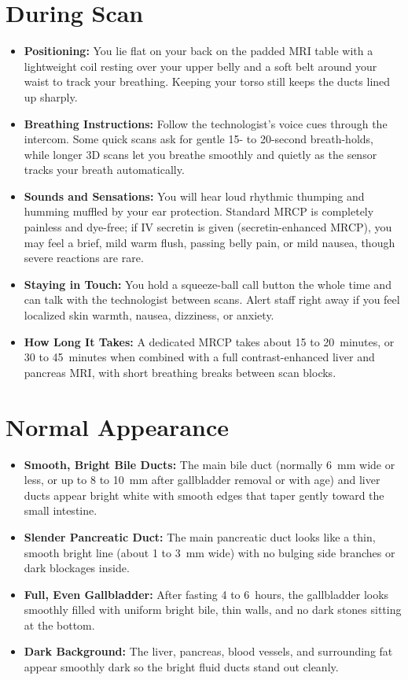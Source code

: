 \section{During Scan}
\begin{itemize}
\item \textbf{Positioning:} You lie flat on your back on the padded MRI table with a lightweight coil resting over your upper belly and a soft belt around your waist to track your breathing. Keeping your torso still keeps the ducts lined up sharply.
\item \textbf{Breathing Instructions:} Follow the technologist's voice cues through the intercom. Some quick scans ask for gentle 15- to 20-second breath-holds, while longer 3D scans let you breathe smoothly and quietly as the sensor tracks your breath automatically.
\item \textbf{Sounds and Sensations:} You will hear loud rhythmic thumping and humming muffled by your ear protection. Standard MRCP is completely painless and dye-free; if IV secretin is given (secretin-enhanced MRCP), you may feel a brief, mild warm flush, passing belly pain, or mild nausea, though severe reactions are rare.
\item \textbf{Staying in Touch:} You hold a squeeze-ball call button the whole time and can talk with the technologist between scans. Alert staff right away if you feel localized skin warmth, nausea, dizziness, or anxiety.
\item \textbf{How Long It Takes:} A dedicated MRCP takes about 15 to 20~minutes, or 30 to 45~minutes when combined with a full contrast-enhanced liver and pancreas MRI, with short breathing breaks between scan blocks.
\end{itemize}

\section{Normal Appearance}
\begin{itemize}
\item \textbf{Smooth, Bright Bile Ducts:} The main bile duct (normally 6~mm wide or less, or up to 8 to 10~mm after gallbladder removal or with age) and liver ducts appear bright white with smooth edges that taper gently toward the small intestine.
\item \textbf{Slender Pancreatic Duct:} The main pancreatic duct looks like a thin, smooth bright line (about 1 to 3~mm wide) with no bulging side branches or dark blockages inside.
\item \textbf{Full, Even Gallbladder:} After fasting 4 to 6~hours, the gallbladder looks smoothly filled with uniform bright bile, thin walls, and no dark stones sitting at the bottom.
\item \textbf{Dark Background:} The liver, pancreas, blood vessels, and surrounding fat appear smoothly dark so the bright fluid ducts stand out cleanly.
\end{itemize}

